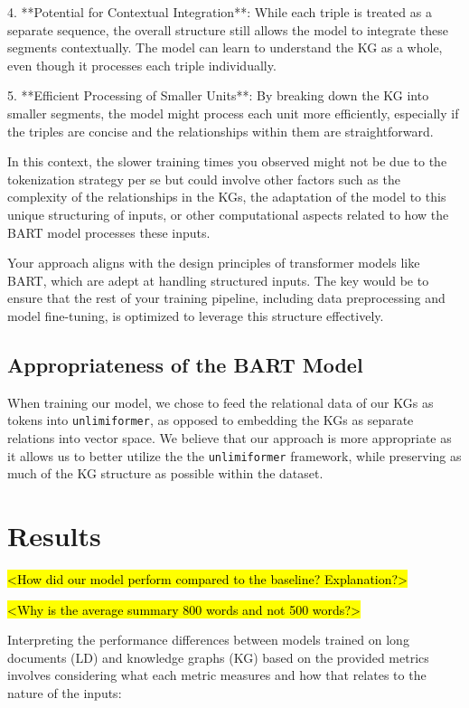 \documentclass[12pt]{article}
\begin{document}
4. **Potential for Contextual Integration**: While each triple is treated as a separate sequence, the overall structure still allows the model to integrate these segments contextually. The model can learn to understand the KG as a whole, even though it processes each triple individually.


5. **Efficient Processing of Smaller Units**: By breaking down the KG into smaller segments, the model might process each unit more efficiently, especially if the triples are concise and the relationships within them are straightforward.


In this context, the slower training times you observed might not be due to the tokenization strategy per se but could involve other factors such as the complexity of the relationships in the KGs, the adaptation of the model to this unique structuring of inputs, or other computational aspects related to how the BART model processes these inputs.


Your approach aligns with the design principles of transformer models like BART, which are adept at handling structured inputs. The key would be to ensure that the rest of your training pipeline, including data preprocessing and model fine-tuning, is optimized to leverage this structure effectively.


\subsection*{Appropriateness of the BART Model}
When training our model, we chose to feed the relational data of our KGs as tokens into \texttt{unlimiformer}, as opposed to embedding the KGs as separate relations into vector space. We believe that our approach is more appropriate as it allows us to better utilize the the \texttt{unlimiformer} framework, while preserving as much of the KG structure as possible within the dataset.


\section{Results}
\hl{<How did our model perform compared to the baseline? Explanation?>}


\hl{<Why is the average summary 800 words and not 500 words?>}


Interpreting the performance differences between models trained on long documents (LD) and knowledge graphs (KG) based on the  provided metrics involves considering what each metric measures and how that relates to the nature of the inputs:
\end{document}
